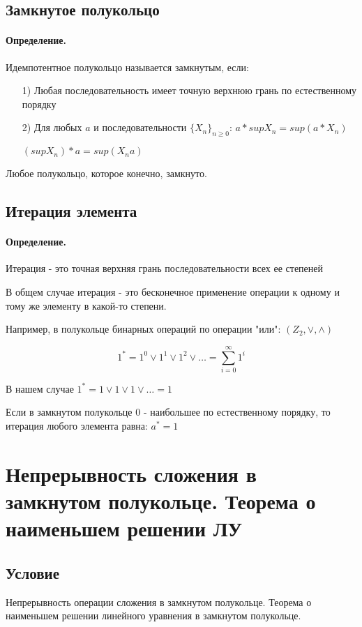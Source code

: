 \documentclass{report}
\begin{document}
\subsection{Замкнутое полукольцо}
\paragraph*{Определение.}
Идемпотентное полукольцо называется замкнутым, если:
\begin{itemize}
	\item[1)] Любая последовательность имеет точную верхнюю грань по естественному порядку
	\item[2)] Для любых $a$ и последовательности $\{X_n\}_{n \geq 0}$:\newline
		$a*supX_n = sup(a*X_n)$

		$(supX_n)*a = sup(X_n a)$
\end{itemize}


Любое полукольцо, которое конечно, замкнуто.

\subsection{Итерация элемента}
\paragraph*{Определение.} Итерация - это точная верхняя грань последовательности всех ее степеней


В общем случае итерация - это бесконечное применение операции к одному и тому же элементу в какой-то степени.

Например, в полукольце бинарных операций по операции "или":\newline
$(Z_2, \lor, \land)$

\[
1^{*} = 1^{0} \lor 1^{1} \lor 1^2 \lor \ldots = \sum\limits_{i=0}^{\infty}1^{i} 
\] 

В нашем случае $1^* = 1 \lor 1 \lor 1 \lor \dots = 1$

\medskip

Если в замкнутом полукольце $0$ - наибольшее по естественному порядку, то
итерация любого элемента равна: $a^* = 1$

\newpage

\section{Непрерывность сложения в замкнутом полукольце. Теорема о наименьшем решении ЛУ}
\subsection{Условие}
Непрерывность операции сложения в замкнутом полукольце. Теорема о наименьшем
решении линейного уравнения в замкнутом полукольце.
\end{document}
